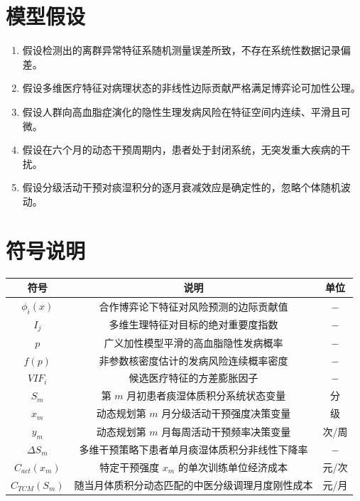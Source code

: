 \documentclass[12pt]{article}
\begin{document}
		\section{模型假设}
		{\songti{}
		\begin{enumerate}
			\item 假设检测出的离群异常特征系随机测量误差所致，不存在系统性数据记录偏差。
			\item 假设多维医疗特征对病理状态的非线性边际贡献严格满足博弈论可加性公理。
			\item 假设人群向高血脂症演化的隐性生理发病风险在特征空间内连续、平滑且可微。
			\item 假设在六个月的动态干预周期内，患者处于封闭系统，无突发重大疾病的干扰。
			\item 假设分级活动干预对痰湿积分的逐月衰减效应是确定性的，忽略个体随机波动。
		\end{enumerate}
		}
		

	
	\section{符号说明}
	{\songti{}
		\begin{table}[htbp]
			\centering
			\renewcommand{\arraystretch}{1.5}
			\begin{tabular}{ccc}
				\toprule
				\textbf{符号} & \textbf{说明} & \textbf{单位} \\
				\midrule
				$\phi_i(x)$ & 合作博弈论下特征对风险预测的边际贡献值 & $-$ \\
				$I_j$ & 多维生理特征对目标的绝对重要度指数 & $-$ \\
				$p$ & 广义加性模型平滑的高血脂隐性发病概率 & $-$ \\
				$\hat{f}(p)$ & 非参数核密度估计的发病风险连续概率密度 & $-$ \\
				$VIF_i$ & 候选医疗特征的方差膨胀因子 & $-$ \\
				$S_m$ & 第 $m$ 月初患者痰湿体质积分系统状态变量 & 分 \\
				$x_m$ & 动态规划第 $m$ 月分级活动干预强度决策变量 & 级 \\
				$y_m$ & 动态规划第 $m$ 月每周活动干预频率决策变量 & 次/周 \\
				$\Delta S_m$ & 多维干预策略下患者单月痰湿体质积分非线性下降率 & $-$ \\
				$C_{act}(x_m)$ & 特定干预强度 $x_m$ 的单次训练单位经济成本 & 元/次 \\
				$C_{TCM}(S_m)$ & 随当月体质积分动态匹配的中医分级调理月度刚性成本 & 元/月 \\
				\bottomrule
			\end{tabular}
		\end{table}
	}
	
\end{document}
